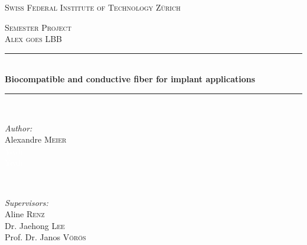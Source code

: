 \begin{titlepage}

\newcommand{\HRule}{\rule{\linewidth}{0.5mm}} %

\center %
 
{\textsc{\LARGE Swiss Federal Institute of Technology Zürich  }\\[1cm]
}

\textsc{\Large Semester Project}\\[0.5cm] %
\textsc{\large Alex goes LBB}\\[0.5cm] %


\HRule \\[0.4cm]
{  {\huge \bfseries Biocompatible and conductive fiber for implant applications}}\\[0.4cm] %

\HRule \\[1.5cm]
 

\begin{minipage}{0.4\textwidth}
\begin{flushleft} \large
\emph{Author:}\\
Alexandre \textsc{Meier}\\
\textcolor{white}{Yeah}\\
\textcolor{white}{Yeah}
\end{flushleft}
\end{minipage}
~
\begin{minipage}{0.5\textwidth}
\begin{flushright} \large
\emph{Supervisors:} \\
Aline \textsc{Renz}\\
Dr. Jaehong \textsc{Lee}\\[0.1cm]
Prof. Dr. Janos \textsc{Vörös}
\end{flushright}
\end{minipage}\\[2cm]



\end{titlepage}
